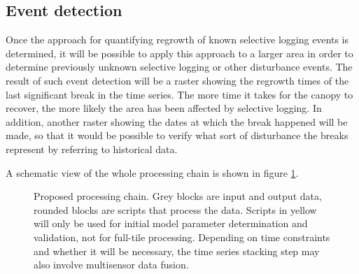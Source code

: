 \documentclass[a4paper,10pt]{article}
\begin{document}
\subsection{Event detection}

Once the approach for quantifying regrowth of known selective logging events is determined, it will be possible to apply this approach to a larger area in order to determine previously unknown selective logging or other disturbance events. The result of such event detection will be a raster showing the regrowth times of the last significant break in the time series. The more time it takes for the canopy to recover, the more likely the area has been affected by selective logging. In addition, another raster showing the dates at which the break happened will be made, so that it would be possible to verify what sort of disturbance the breaks represent by referring to historical data.

A schematic view of the whole processing chain is shown in figure \ref{fig-processing}.

\begin{figure}
  \centering
  \caption{Proposed processing chain. Grey blocks are input and output data, rounded blocks are scripts that process the data. Scripts in yellow will only be used for initial model parameter determination and validation, not for full-tile processing. Depending on time constraints and whether it will be necessary, the time series stacking step may also involve multisensor data fusion.}
  \label{fig-processing}
\end{figure}
\end{document}

